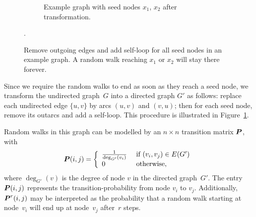 \begin{figure}
\begin{subfigure}{\textwidth}
    \caption{Example graph with seed nodes $x_1$, $x_2$ after transformation.}
\end{subfigure}
\caption[Removal of outgoing edges of seed nodes in a graph]
{Remove outgoing edges and add self-loop for all seed nodes in an example graph. A random walk reaching $x_1$ or $x_2$ will stay there forever.}
\label{fig:modgraph}.
\end{figure}

Since we require the random walks to end as soon as they reach a seed node, we transform 
the undirected graph~$G$ into a directed graph $G'$ as follows: replace each undirected 
edge $\{u, v\}$ by arcs $(u, v)$ and $(v, u)$; then for each seed node, remove its 
outarcs and add a self-loop. This procedure is illustrated in Figure~\ref{fig:modgraph}.


Random walks in this graph can be modelled by an $n \times n$ transition matrix $\boldsymbol{P}$, with
\begin{equation}\label{eqn:defining_prob}
	\boldsymbol{P}(i, j) = \left \{ 
							\begin{array}{ll}
                                \frac{1}{\deg_{G'} (v_i)} & \mbox{ if } (v_i, v_j) \in E(G') \\
								0			& \mbox{ otherwise,}
							\end{array}
					\right.
\end{equation}
where $\deg_{G'} (v)$ is the degree of node $v$ in the directed graph~$G'$.
The entry $\boldsymbol{P}(i, j)$ represents the transition-probability from node $v_i$ to $v_j$.
Additionally, $\boldsymbol{P}^r (i, j)$ may be interpreted 
as the probability that a random walk starting at node~$v_i$ will end up at node~$v_j$ 
after~$r$ steps. 

